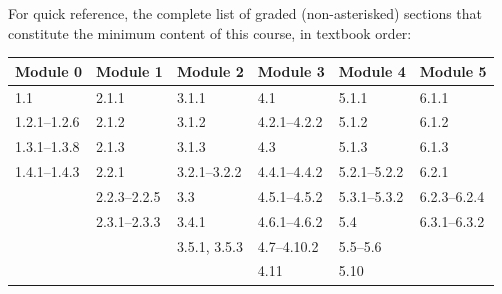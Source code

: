 \documentclass[11pt]{article}
\begin{document}
For quick reference, the complete list of graded (non-asterisked) sections that constitute
the minimum content of this course, in textbook order:
\begin{center}
\small
\begin{tabular}{p{2.35cm}p{2.35cm}p{2.35cm}p{2.35cm}p{2.35cm}p{2.35cm}}
\toprule
Module 0 & Module 1 & Module 2 & Module 3 & Module 4 & Module 5 \\
\midrule
1.1 & 2.1.1 & 3.1.1 & 4.1 & 5.1.1 & 6.1.1 \\
1.2.1--1.2.6 & 2.1.2 & 3.1.2 & 4.2.1--4.2.2 & 5.1.2 & 6.1.2 \\
1.3.1--1.3.8 & 2.1.3 & 3.1.3 & 4.3 & 5.1.3 & 6.1.3 \\
1.4.1--1.4.3 & 2.2.1 & 3.2.1--3.2.2 & 4.4.1--4.4.2 & 5.2.1--5.2.2 & 6.2.1 \\
 & 2.2.3--2.2.5 & 3.3 & 4.5.1--4.5.2 & 5.3.1--5.3.2 & 6.2.3--6.2.4 \\
 & 2.3.1--2.3.3 & 3.4.1 & 4.6.1--4.6.2 & 5.4 & 6.3.1--6.3.2 \\
 &  & 3.5.1, 3.5.3 & 4.7--4.10.2 & 5.5--5.6 & \\
 &  &  & 4.11 & 5.10 & \\
\bottomrule
\end{tabular}
\end{center}
\end{document}
